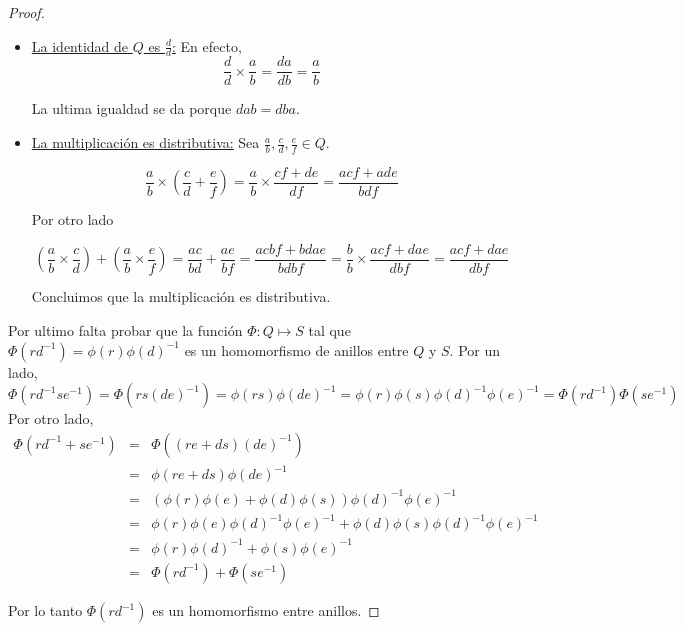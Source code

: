 \documentclass[letter,twoside,12pt]{article}
\begin{document}
\begin{proof}
\begin{itemize}
\item \underline{La identidad de $ Q $ es $ \frac{d}{d} $:} En efecto,
\begin{equation}
\frac{d}{d} \times \frac{a}{b}=\frac{da}{db}=\frac{a}{b} \nonumber
\end{equation} 

La ultima igualdad se da porque $ dab=dba $.

\item \underline{La multiplicaci\'on es distributiva:} Sea $ \frac{a}{b},  \frac{c}{d}, \frac{e}{f} \in Q $.

\begin{equation}
\frac{a}{b}\times(\frac{c}{d}+\frac{e}{f})=\frac{a}{b}\times \frac{cf+de}{df}=\frac{acf+ade}{bdf} \nonumber
\end{equation}

Por otro lado

\begin{equation}
(\frac{a}{b} \times \frac{c}{d})+(\frac{a}{b} \times \frac{e}{f})= \frac{ac}{bd}+\frac{ae}{bf} = \frac{acbf+bdae}{bdbf} = \frac{b}{b}\times \frac{acf+dae}{dbf}=\frac{acf+dae}{dbf}\nonumber
\end{equation}

Concluimos que la multiplicaci\'on es distributiva.

\end{itemize}

Por ultimo falta probar que la funci\'on $ \Phi: Q \mapsto S $ tal que $ \Phi(rd^{-1})=\phi(r)\phi(d)^{-1} $ es un homomorfismo de anillos entre $Q$ y $S$. 
Por un lado,
\begin{equation}
\Phi(rd^{-1}se^{-1})=\Phi(rs(de)^{-1})=\phi(rs)\phi(de)^{-1}=\phi(r)\phi(s)\phi(d)^{-1}\phi(e)^{-1}=\Phi(rd^{-1})\Phi(se^{-1}) \nonumber
\end{equation}
Por otro lado,
\begin{eqnarray}
\Phi(rd^{-1}+se^{-1})&=&\Phi((re+ds)(de)^{-1}) \nonumber
\\&=&\phi(re+ds)\phi(de)^{-1} \nonumber
\\&=&(\phi(r)\phi(e)+\phi(d)\phi(s))\phi(d)^{-1}\phi(e)^{-1} \nonumber
\\&=&\phi(r)\phi(e)\phi(d)^{-1}\phi(e)^{-1}+\phi(d)\phi(s)\phi(d)^{-1}\phi(e)^{-1} \nonumber
\\&=&\phi(r)\phi(d)^{-1}+\phi(s)\phi(e)^{-1} \nonumber
\\&=&\Phi(rd^{-1})+\Phi(se^{-1}) \nonumber
\end{eqnarray}

Por lo tanto $ \Phi(rd^{-1}) $ es un homomorfismo entre anillos.
\end{proof}
\end{document}
